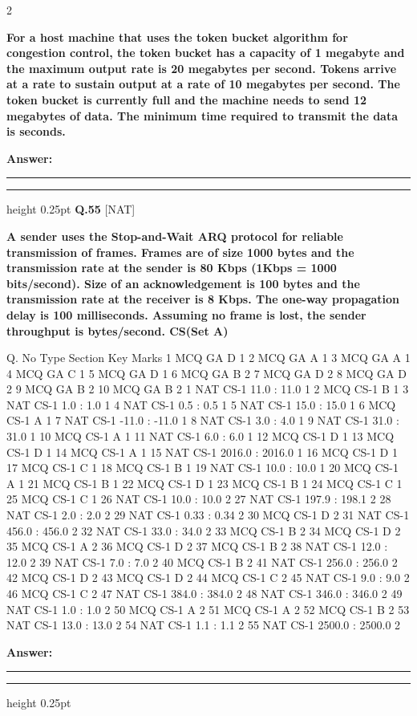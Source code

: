 \documentclass[a4paper,10pt,twoside]{article}
\begin{document}
\begin{multicols}{2}
{\bfseries For a host machine that uses the token bucket algorithm for congestion control, the token
bucket has a capacity of 1 megabyte and the maximum output rate is 20 megabytes per second.
Tokens arrive at a rate to sustain output at a rate of 10 megabytes per second. The token bucket
is currently full and the machine needs to send 12 megabytes of data. The minimum time
required to transmit the data is
seconds. \par}
\par\vspace{3pt}\noindent\textbf{Answer:} \rule{3.2cm}{0.4pt}
\par\vspace{6pt}\hrule height 0.25pt\vspace{6pt}
\noindent\textbf{Q.55} \hfill {\footnotesize\textsf{[NAT]}}
\par\vspace{2pt}
{\bfseries A sender uses the Stop-and-Wait ARQ protocol for reliable transmission of frames. Frames
are of size 1000 bytes and the transmission rate at the sender is 80 Kbps (1Kbps = 1000
bits/second). Size of an acknowledgement is 100 bytes and the transmission rate at the receiver
is 8 Kbps. The one-way propagation delay is 100 milliseconds.
Assuming no frame is lost, the sender throughput is
bytes/second.
CS(Set A)
\par\smallskip
Q. No Type
Section
Key
Marks
1
MCQ
GA
D
1
2
MCQ
GA
A
1
3
MCQ
GA
A
1
4
MCQ
GA
C
1
5
MCQ
GA
D
1
6
MCQ
GA
B
2
7
MCQ
GA
D
2
8
MCQ
GA
D
2
9
MCQ
GA
B
2
10
MCQ
GA
B
2
1
NAT
CS-1
11.0 : 11.0
1
2
MCQ
CS-1
B
1
3
NAT
CS-1
1.0 : 1.0
1
4
NAT
CS-1
0.5 : 0.5
1
5
NAT
CS-1
15.0 : 15.0
1
6
MCQ
CS-1
A
1
7
NAT
CS-1
-11.0 : -11.0
1
8
NAT
CS-1
3.0 : 4.0
1
9
NAT
CS-1
31.0 : 31.0
1
10
MCQ
CS-1
A
1
11
NAT
CS-1
6.0 : 6.0
1
12
MCQ
CS-1
D
1
13
MCQ
CS-1
D
1
14
MCQ
CS-1
A
1
15
NAT
CS-1
2016.0 : 2016.0
1
16
MCQ
CS-1
D
1
17
MCQ
CS-1
C
1
18
MCQ
CS-1
B
1
19
NAT
CS-1
10.0 : 10.0
1
20
MCQ
CS-1
A
1
21
MCQ
CS-1
B
1
22
MCQ
CS-1
D
1
23
MCQ
CS-1
B
1
24
MCQ
CS-1
C
1
25
MCQ
CS-1
C
1
26
NAT
CS-1
10.0 : 10.0
2
27
NAT
CS-1
197.9 : 198.1
2
28
NAT
CS-1
2.0 : 2.0
2
29
NAT
CS-1
0.33 : 0.34
2
30
MCQ
CS-1
D
2
31
NAT
CS-1
456.0 : 456.0
2
32
NAT
CS-1
33.0 : 34.0
2
33
MCQ
CS-1
B
2
34
MCQ
CS-1
D
2
35
MCQ
CS-1
A
2
36
MCQ
CS-1
D
2
37
MCQ
CS-1
B
2
38
NAT
CS-1
12.0 : 12.0
2
39
NAT
CS-1
7.0 : 7.0
2
40
MCQ
CS-1
B
2
41
NAT
CS-1
256.0 : 256.0
2
42
MCQ
CS-1
D
2
43
MCQ
CS-1
D
2
44
MCQ
CS-1
C
2
45
NAT
CS-1
9.0 : 9.0
2
46
MCQ
CS-1
C
2
47
NAT
CS-1
384.0 : 384.0
2
48
NAT
CS-1
346.0 : 346.0
2
49
NAT
CS-1
1.0 : 1.0
2
50
MCQ
CS-1
A
2
51
MCQ
CS-1
A
2
52
MCQ
CS-1
B
2
53
NAT
CS-1
13.0 : 13.0
2
54
NAT
CS-1
1.1 : 1.1
2
55
NAT
CS-1
2500.0 : 2500.0
2 \par}
\par\vspace{3pt}\noindent\textbf{Answer:} \rule{3.2cm}{0.4pt}
\par\vspace{6pt}\hrule height 0.25pt\vspace{6pt}
\end{multicols}
\end{document}
